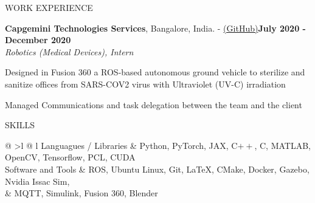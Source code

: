 \documentclass{resume} %
\begin{document}
\begin{rSection}{WORK EXPERIENCE}
	\begin{rSubsectiond}{\textbf{Capgemini Technologies Services}, Bangalore, India. - \href{https://github.com/Sahas-Ananth/ROS-ASV}{(GitHub)}}{\textbf{July 2020 - December 2020} \\\textit{Robotics (Medical Devices), Intern}}
	\item Designed in Fusion 360 a ROS-based autonomous ground vehicle to sterilize and sanitize offices from SARS-COV2 virus with Ultraviolet (UV-C) irradiation
	\item Managed Communications and task delegation between the team and the client
	\end{rSubsectiond}

    \end{rSection}
\vspace{-3mm}
    \begin{rSection}{SKILLS}
	\begin{tabular}{ @ {} >{\bfseries}l @{\hspace{3ex}} l }
	    Languagues / Libraries &  Python, PyTorch, JAX, C$++$, C, MATLAB, OpenCV, Tensorflow, PCL, CUDA\\
	    Software and Tools & ROS, Ubuntu Linux, Git, LaTeX, CMake, Docker, Gazebo, Nvidia Issac Sim, \\
	    & MQTT, Simulink, Fusion 360, Blender\\
	\end{tabular}
    \end{rSection}
\vspace{-3.5mm}
\end{document}
